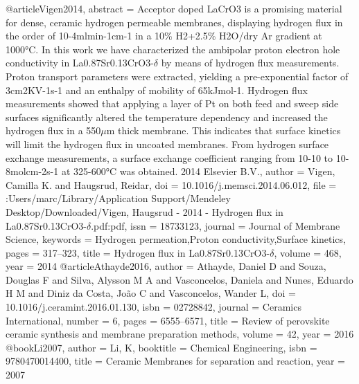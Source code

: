 @article{Vigen2014,
abstract = {Acceptor doped LaCrO3 is a promising material for dense, ceramic hydrogen permeable membranes, displaying hydrogen flux in the order of 10-4mlmin-1cm-1 in a 10{\%} H2+2.5{\%} H2O/dry Ar gradient at 1000°C. In this work we have characterized the ambipolar proton electron hole conductivity in La0.87Sr0.13CrO3-$\delta$ by means of hydrogen flux measurements. Proton transport parameters were extracted, yielding a pre-exponential factor of 3cm2KV-1s-1 and an enthalpy of mobility of 65kJmol-1. Hydrogen flux measurements showed that applying a layer of Pt on both feed and sweep side surfaces significantly altered the temperature dependency and increased the hydrogen flux in a 550$\mu$m thick membrane. This indicates that surface kinetics will limit the hydrogen flux in uncoated membranes. From hydrogen surface exchange measurements, a surface exchange coefficient ranging from 10-10 to 10-8molcm-2s-1 at 325-600°C was obtained. {\textcopyright} 2014 Elsevier B.V.},
author = {Vigen, Camilla K. and Haugsrud, Reidar},
doi = {10.1016/j.memsci.2014.06.012},
file = {:Users/marc/Library/Application Support/Mendeley Desktop/Downloaded/Vigen, Haugsrud - 2014 - Hydrogen flux in La0.87Sr0.13CrO3-$\delta$.pdf:pdf},
issn = {18733123},
journal = {Journal of Membrane Science},
keywords = {Hydrogen permeation,Proton conductivity,Surface kinetics},
pages = {317--323},
title = {{Hydrogen flux in La0.87Sr0.13CrO3-$\delta$}},
volume = {468},
year = {2014}
}
@article{Athayde2016,
author = {Athayde, Daniel D and Souza, Douglas F and Silva, Alysson M A and Vasconcelos, Daniela and Nunes, Eduardo H M and {Diniz da Costa}, Jo{\~{a}}o C and Vasconcelos, Wander L},
doi = {10.1016/j.ceramint.2016.01.130},
isbn = {02728842},
journal = {Ceramics International},
number = {6},
pages = {6555--6571},
title = {{Review of perovskite ceramic synthesis and membrane preparation methods}},
volume = {42},
year = {2016}
}
@book{Li2007,
author = {Li, K},
booktitle = {Chemical Engineering},
isbn = {9780470014400},
title = {{Ceramic Membranes for separation and reaction}},
year = {2007}
}
